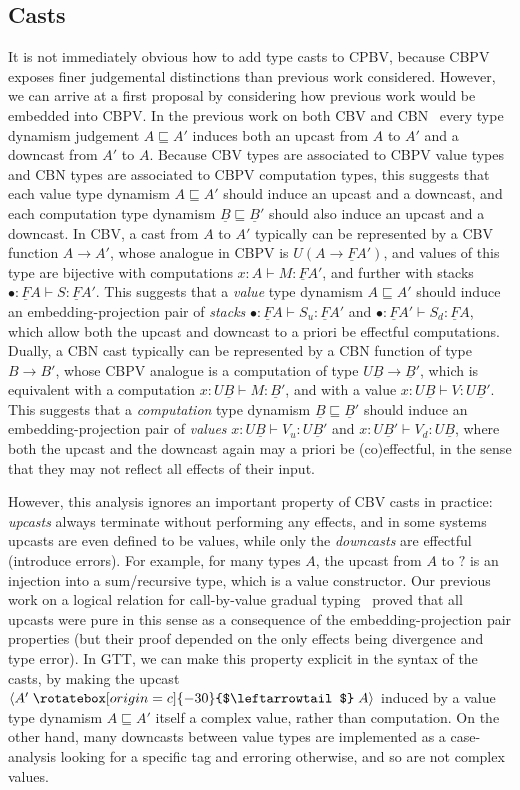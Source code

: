 \documentclass[acmsmall,nonacm]{acmart}
\renewcommand{\u}{\underline}
\newcommand{\ltdyn}{\sqsubseteq}
\newcommand{\dynv}{{?}}
\newcommand{\uarrow}{\mathrel{\rotatebox[origin=c]{-30}{$\leftarrowtail$}}}
\newcommand{\upcast}[2]{\langle{#2}\uarrow{#1}\rangle}
\begin{document}
\subsection{Casts}
\label{sec:gtt-casts}

It is not immediately obvious how to add type casts to CPBV, because
CBPV exposes finer judgemental distinctions than previous work
considered.  However, we can arrive at a first proposal by considering
how previous work would be embedded into CBPV.
%
In the previous work on both CBV and
CBN~\citep{newahmed18,newlicata2018-fscd} every type dynamism judgement
$A \ltdyn A'$ induces both an upcast from $A$ to $A'$ and a downcast
from $A'$ to $A$.
%
Because CBV types are associated to CBPV value types and CBN types are
associated to CBPV computation types, this suggests that each value type
dynamism $A \ltdyn A'$ should induce an upcast and a downcast, and each
computation type dynamism $\u B \ltdyn \u B'$ should also induce an
upcast and a downcast.
%
In CBV, a cast from $A$ to $A'$ typically can be represented by a CBV
function $A \to A'$, whose analogue in CBPV is $U(A \to \u F A')$, and
values of this type are bijective with computations $x : A \vdash M : \u
F A'$, and further with stacks $\bullet : \u F A \vdash
S : \u F A'$. This suggests that a
\emph{value} type dynamism $A \ltdyn A'$ should induce an
embedding-projection pair of \emph{stacks} $\bullet : \u F A \vdash S_u
: \u F A'$ and $\bullet : \u F A' \vdash S_d : \u F A$, which allow both
the upcast and downcast to a priori be effectful computations.
%
Dually, a CBN cast typically can be represented by a CBN function of
type $B \to B'$, whose CBPV analogue is a computation of type $U \u B
\to \u B'$, which is equivalent with a computation $x : U \u B \vdash M : \u B'$,
and with a value $x : U \u B \vdash V : U \u B'$. This suggests that a
\emph{computation} type dynamism $\u B \ltdyn \u B'$ should induce an
embedding-projection pair of \emph{values} $x : U \u B \vdash V_u : U \u
B'$ and $x : U \u B' \vdash V_d : U \u B$, where both the upcast and the
downcast again may a priori be (co)effectful, in the sense that they may
not reflect all effects of their input.

However, this analysis ignores an important property of CBV casts in practice:
\emph{upcasts} always terminate without performing any effects, and in
some systems upcasts are even defined to be values, while only the
\emph{downcasts} are effectful (introduce errors).  For example, for many types $A$, the
upcast from $A$ to $\dynv$ is an injection into a sum/recursive type,
which is a value constructor.  Our previous work on a logical
relation for call-by-value gradual typing~\cite{newahmed18} proved that all
upcasts were pure in this sense as a consequence of the embedding-projection pair properties (but their proof depended on the only effects being
divergence and type error).
In GTT, we can make this property explicit
in the syntax of the casts, by making the upcast $\upcast{A}{A'}$
induced by a value type dynamism $A \ltdyn A'$ itself a complex value,
rather than computation.  On the other hand, many downcasts between value
types are implemented as a case-analysis looking for a specific
tag and erroring otherwise, and so are not complex values.
\end{document}
